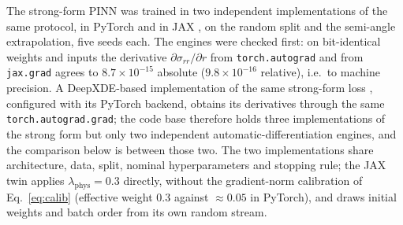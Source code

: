 The strong-form PINN was trained in two independent implementations of the same protocol, in PyTorch \cite{TODO-pytorch} and in JAX \cite{TODO-jax}, on the random split and the semi-angle extrapolation, five seeds each. The engines were checked first: on bit-identical weights and inputs the derivative $\partial\sigma_{rr}/\partial r$ from \texttt{torch.autograd} and from \texttt{jax.grad} agrees to $8.7\times10^{-15}$ absolute ($9.8\times10^{-16}$ relative), i.e.\ to machine precision. A DeepXDE-based implementation of the same strong-form loss \cite{TODO-deepxde}, configured with its PyTorch backend, obtains its derivatives through the same \texttt{torch.autograd.grad}; the code base therefore holds three implementations of the strong form but only two independent automatic-differentiation engines, and the comparison below is between those two. The two implementations share architecture, data, split, nominal hyperparameters and stopping rule; the JAX twin applies $\lambda_{\mathrm{phys}} = 0.3$ directly, without the gradient-norm calibration of Eq.~\eqref{eq:calib} (effective weight 0.3 against $\approx 0.05$ in PyTorch), and draws initial weights and batch order from its own random stream. %


